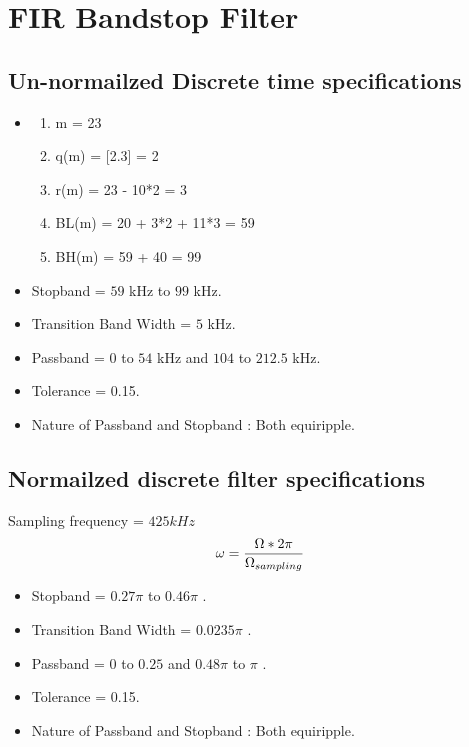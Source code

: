 \documentclass{article}
\begin{document}
\newpage

\section{FIR Bandstop Filter}

\subsection{Un-normailzed Discrete time specifications}

\begin{itemize}
    \item \begin{enumerate}
                \item m = 23
                \item q(m) = [2.3] = 2
                \item r(m) = 23 - 10*2 = 3
                \item BL(m) = 20 + 3*2 + 11*3 = 59
                \item BH(m) = 59 + 40 = 99
            \end{enumerate}

    \item Stopband = $59$ kHz to $99$ kHz.
    \item Transition Band Width = $5$ kHz.
    \item Passband = $0$ to $54$ kHz and $104$ to $212.5$ kHz.
    \item Tolerance = 0.15.
    \item Nature of Passband and Stopband : Both equiripple.
\end{itemize}


\subsection{Normailzed discrete filter specifications}
Sampling frequency = $425 kHz$\\
\begin{equation}
    \omega = \frac{\Omega * 2\pi}{\Omega _{sampling}}\\
\end{equation}

\begin{itemize}
    \item Stopband = $0.27\pi$ to $0.46\pi$ .
    \item Transition Band Width = $0.0235\pi$ .
    \item Passband = $0$ to $0.25$  and $0.48\pi$ to $\pi$ .
    \item Tolerance = 0.15.
    \item Nature of Passband and Stopband : Both equiripple.
\end{itemize}
\end{document}
